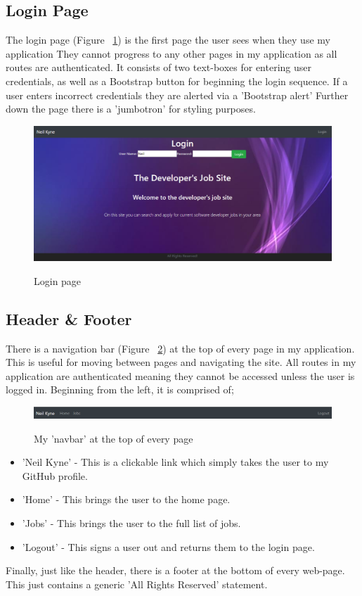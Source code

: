 \subsection{Login Page}
The login page (Figure ~\ref{login_label}) is the first page the user sees when they use my application They cannot progress to any other pages in my application as all routes are authenticated. It consists of two text-boxes for entering user credentials, as well as a Bootstrap button for beginning the login sequence. If a user enters incorrect credentials they are alerted via a 'Bootstrap alert' Further down the page there is a 'jumbotron' for styling purposes.

\begin{figure}[ht]
    \centering
    \includegraphics[scale=0.3]{Images/login.png} 
    \label{login_label}
    \caption{Login page}
\end{figure}

\subsection{Header \& Footer}
There is a navigation bar (Figure ~\ref{header_label}) at the top of every page in my application. This is useful for moving between pages and navigating the site. All routes in my application are authenticated meaning they cannot be accessed unless the user is logged in. Beginning from the left, it is comprised of;

\begin{figure}[ht]
    \centering
    \includegraphics[scale=0.35]{Images/header.png} 
    \label{header_label}
    \caption{My 'navbar' at the top of every page}
\end{figure}
\begin{itemize}
    \item 'Neil Kyne' - This is a clickable link which simply takes the user to my GitHub profile.
    \item 'Home' - This brings the user to the home page.
    \item 'Jobs' - This brings the user to the full list of jobs.
    \item 'Logout' - This signs a user out and returns them to the login page.
\end{itemize}
Finally, just like the header, there is a footer at the bottom of every web-page. This just contains a generic 'All Rights Reserved' statement.

